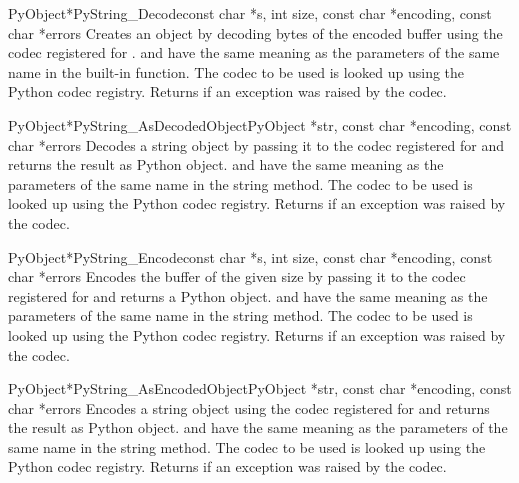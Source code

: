 \begin{cfuncdesc}{PyObject*}{PyString_Decode}{const char *s,
                                               int size,
                                               const char *encoding,
                                               const char *errors}
  Creates an object by decoding  bytes of the encoded
  buffer  using the codec registered for
  .   and  have the same
  meaning as the parameters of the same name in the
   built-in function.  The codec to be used is
  looked up using the Python codec registry.  Returns \NULL{} if
  an exception was raised by the codec.
\end{cfuncdesc}

\begin{cfuncdesc}{PyObject*}{PyString_AsDecodedObject}{PyObject *str,
                                               const char *encoding,
                                               const char *errors}
  Decodes a string object by passing it to the codec registered for
   and returns the result as Python
  object.  and  have the same meaning as the
  parameters of the same name in the string  method.
  The codec to be used is looked up using the Python codec registry.
  Returns \NULL{} if an exception was raised by the codec.
\end{cfuncdesc}

\begin{cfuncdesc}{PyObject*}{PyString_Encode}{const char *s,
                                               int size,
                                               const char *encoding,
                                               const char *errors}
  Encodes the  buffer of the given size by passing it to
  the codec registered for  and returns a Python object.
   and  have the same meaning as the
  parameters of the same name in the string  method.
  The codec to be used is looked up using the Python codec
  registry.  Returns \NULL{} if an exception was raised by the
  codec.
\end{cfuncdesc}

\begin{cfuncdesc}{PyObject*}{PyString_AsEncodedObject}{PyObject *str,
                                               const char *encoding,
                                               const char *errors}
  Encodes a string object using the codec registered for
   and returns the result as Python object.
   and  have the same meaning as the
  parameters of the same name in the string  method.
  The codec to be used is looked up using the Python codec registry.
  Returns \NULL{} if an exception was raised by the codec.
\end{cfuncdesc}


